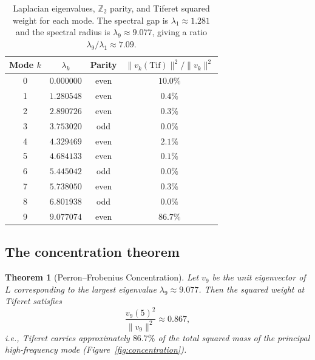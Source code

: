 \documentclass[11pt,a4paper]{amsart}
\newtheorem{theorem}{Theorem}[section]
\theoremstyle{remark}
\newcommand{\bbZ}{\mathbb{Z}}
\begin{document}
\begin{table}[htbp]
\centering
\caption{Laplacian eigenvalues, $\bbZ_2$ parity, and Tiferet squared weight
for each mode. The spectral gap is $\lambda_1 \approx 1.281$ and the
spectral radius is $\lambda_9 \approx 9.077$, giving a ratio
$\lambda_9 / \lambda_1 \approx 7.09$.}
\label{tab:spectrum}
\begin{tabular}{cccc}
\toprule
Mode $k$ & $\lambda_k$ & Parity & $\|v_k(\text{Tif})\|^2 / \|v_k\|^2$ \\
\midrule
0 & $0.000000$ & even & $10.0\%$ \\
1 & $1.280548$ & even & $0.4\%$ \\
2 & $2.890726$ & even & $0.3\%$ \\
3 & $3.753020$ & odd  & $0.0\%$ \\
4 & $4.329469$ & even & $2.1\%$ \\
5 & $4.684133$ & even & $0.1\%$ \\
6 & $5.445042$ & odd  & $0.0\%$ \\
7 & $5.738050$ & even & $0.3\%$ \\
8 & $6.801938$ & odd  & $0.0\%$ \\
9 & $9.077074$ & even & $86.7\%$ \\
\bottomrule
\end{tabular}
\end{table}

\subsection{The concentration theorem}
\label{sec:concentration-theorem}

\begin{theorem}[Perron--Frobenius Concentration]
\label{thm:pf-concentration}
Let $v_9$ be the unit eigenvector of $L$ corresponding to the largest
eigenvalue $\lambda_9 \approx 9.077$. Then the squared weight at Tiferet
satisfies
\begin{equation}
\frac{v_9(5)^2}{\|v_9\|^2} \approx 0.867,
\end{equation}
i.e., Tiferet carries approximately $86.7\%$ of the total squared mass of
the principal high-frequency mode (Figure~\ref{fig:concentration}).
\end{theorem}
\end{document}
